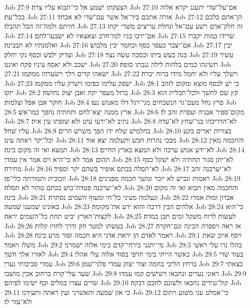 Job 27:9  הצעקתו ישׁמע אל כי־תבוא עליו צרה׃
Job 27:10  אם־על־שׁדי יתענג יקרא אלוה בכל־עת׃
Job 27:11  אורה אתכם ביד־אל אשׁר עם־שׁדי לא אכחד׃
Job 27:12  הן־אתם כלכם חזיתם ולמה־זה הבל תהבלו׃
Job 27:13  זה חלק־אדם רשׁע עם־אל ונחלת עריצים משׁדי יקחו׃
Job 27:14  אם־ירבו בניו למו־חרב וצאצאיו לא ישׂבעו־לחם׃
Job 27:15  שׂרידו במות יקברו ואלמנתיו לא תבכינה׃
Job 27:16  אם־יצבר כעפר כסף וכחמר יכין מלבושׁ׃
Job 27:17  יכין וצדיק ילבשׁ וכסף נקי יחלק׃
Job 27:18  בנה כעשׁ ביתו וכסכה עשׂה נצר׃
Job 27:19  עשׁיר ישׁכב ולא יאסף עיניו פקח ואיננו׃
Job 27:20  תשׂיגהו כמים בלהות לילה גנבתו סופה׃
Job 27:21  ישׂאהו קדים וילך וישׂערהו ממקמו׃
Job 27:22  וישׁלך עליו ולא יחמל מידו ברוח יברח׃
Job 27:23  ישׂפק עלימו כפימו וישׁרק עליו ממקמו׃
Job 28:1  כי ישׁ לכסף מוצא ומקום לזהב יזקו׃
Job 28:2  ברזל מעפר יקח ואבן יצוק נחושׁה׃
Job 28:3  קץ שׂם לחשׁך ולכל־תכלית הוא חוקר אבן אפל וצלמות׃
Job 28:4  פרץ נחל מעם־גר הנשׁכחים מני־רגל דלו מאנושׁ נעו׃
Job 28:5  ארץ ממנה יצא־לחם ותחתיה נהפך כמו־אשׁ׃
Job 28:6  מקום־ספיר אבניה ועפרת זהב לו׃
Job 28:7  נתיב לא־ידעו עיט ולא שׁזפתו עין איה׃
Job 28:8  לא־הדריכהו בני־שׁחץ לא־עדה עליו שׁחל׃
Job 28:9  בחלמישׁ שׁלח ידו הפך משׁרשׁ הרים׃
Job 28:10  בצורות יארים בקע וכל־יקר ראתה עינו׃
Job 28:11  מבכי נהרות חבשׁ ותעלמה יצא אור׃
Job 28:12  והחכמה מאין תמצא ואי זה מקום בינה׃
Job 28:13  לא־ידע אנושׁ ערכה ולא תמצא בארץ החיים׃
Job 28:14  תהום אמר לא בי־היא וים אמר אין עמדי׃
Job 28:15  לא־יתן סגור תחתיה ולא ישׁקל כסף מחירה׃
Job 28:16  לא־תסלה בכתם אופיר בשׁהם יקר וספיר׃
Job 28:17  לא־יערכנה זהב וזכוכית ותמורתה כלי־פז׃
Job 28:18  ראמות וגבישׁ לא יזכר ומשׁך חכמה מפנינים׃
Job 28:19  לא־יערכנה פטדת־כושׁ בכתם טהור לא תסלה׃
Job 28:20  והחכמה מאין תבוא ואי זה מקום בינה׃
Job 28:21  ונעלמה מעיני כל־חי ומעוף השׁמים נסתרה׃
Job 28:22  אבדון ומות אמרו באזנינו שׁמענו שׁמעה׃
Job 28:23  אלהים הבין דרכה והוא ידע את־מקומה׃
Job 28:24  כי־הוא לקצות־הארץ יביט תחת כל־השׁמים יראה׃
Job 28:25  לעשׂות לרוח משׁקל ומים תכן במדה׃
Job 28:26  בעשׂתו למטר חק ודרך לחזיז קלות׃
Job 28:27  אז ראה ויספרה הכינה וגם־חקרה׃
Job 28:28  ויאמר לאדם הן יראת אדני היא חכמה וסור מרע בינה׃
Job 29:1  ויסף איוב שׂאת משׁלו ויאמר׃
Job 29:2  מי־יתנני כירחי־קדם כימי אלוה ישׁמרני׃
Job 29:3  בהלו נרו עלי ראשׁי לאורו אלך חשׁך׃
Job 29:4  כאשׁר הייתי בימי חרפי בסוד אלוה עלי אהלי׃
Job 29:5  בעוד שׁדי עמדי סביבותי נערי׃
Job 29:6  ברחץ הליכי בחמה וצור יצוק עמדי פלגי־שׁמן׃
Job 29:7  בצאתי שׁער עלי־קרת ברחוב אכין מושׁבי׃
Job 29:8  ראוני נערים ונחבאו וישׁישׁים קמו עמדו׃
Job 29:9  שׂרים עצרו במלים וכף ישׂימו לפיהם׃
Job 29:10  קול־נגידים נחבאו ולשׁונם לחכם דבקה׃
Job 29:11  כי אזן שׁמעה ותאשׁרני ועין ראתה ותעידני׃
Job 29:12  כי־אמלט עני משׁוע ויתום ולא־עזר לו׃
